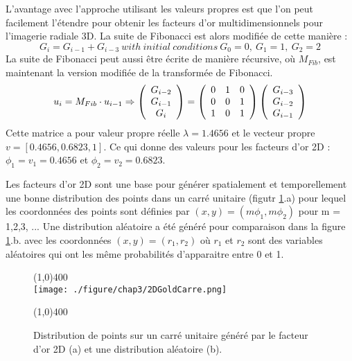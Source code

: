 L'avantage avec l'approche utilisant les valeurs propres est que l'on peut facilement l'étendre pour obtenir les facteurs d'or multidimensionnels pour l'imagerie radiale 3D. La suite de Fibonacci est alors modifiée de cette manière :
\begin{equation}
G_i=G_{i-1}+G_{i-3} \ with \ initial \ conditions \ G_0=0,\ G_1=1,\ G_2=2
\end{equation}
La suite de Fibonacci peut aussi être écrite de manière récursive, où $M_{Fib}$, est maintenant la version modifiée de la transformée de Fibonacci.
\begin{equation}
u_i=M_{Fib} \cdot u_{i-1}\Rightarrow 
\left(
\begin{array}{c}
G_{i-2} \\
G_{i-1} \\
G_{i}
\end{array}
\right)=\left(
\begin{array}{c c c}
0 & 1 & 0 \\
0 & 0 & 1 \\
1 & 0 & 1
\end{array}
\right)\left(
\begin{array}{c}
G_{i-3} \\
G_{i-2} \\
G_{i-1}
\end{array}
\right)
\end{equation}
Cette matrice a pour valeur propre réelle $\lambda=1.4656$ et le vecteur propre $v=[0.4656, 0.6823, 1]$. Ce qui donne des valeurs pour les facteurs d'or 2D : $\phi_1=v_1=0.4656$ et $\phi_2=v_2=0.6823$.

Les facteurs d'or 2D sont une base pour générer spatialement et temporellement une bonne distribution des points dans un carré unitaire (figutr \ref{fig:2DGold}.a) pour lequel les coordonnées des points sont définies par $(x,y)=({m\phi_1},{m\phi_2})$ pour m = 1,2,3, ... Une distribution aléatoire a été généré pour comparaison dans la figure \ref{fig:2DGold}.b. avec les coordonnées $(x,y)=(r_1,r_2)$ où $r_1$ et $r_2$ sont des variables aléatoires qui ont les même probabilités d'apparaitre entre 0 et 1.
\begin{figure}[H]
\centering \line(1,0){400} \\
\texttt{[image: ./figure/chap3/2DGoldCarre.png]}
\caption[Répartition 2D]{\label{fig:2DGold} Distribution de points sur un carré unitaire généré par le facteur d'or 2D (a) et une distribution aléatoire (b).}
\line(1,0){400} \\ \end{figure}

